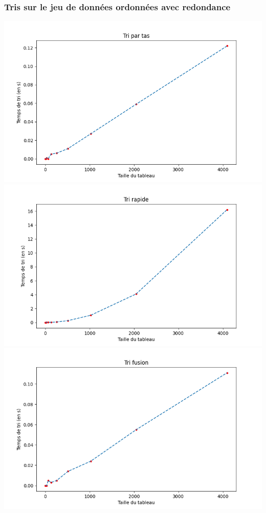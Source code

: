 \documentclass[11pt,a4paper]{article}
\begin{document}
\subsubsection{Tris sur le jeu de données ordonnées avec redondance}
    \includegraphics[scale = 0.7]{../Courbes/Valeurs_triées_avec_répétitions/Tri par tas.png}
    \includegraphics[scale = 0.7]{../Courbes/Valeurs_triées_avec_répétitions/Tri rapide.png}
    \includegraphics[scale = 0.7]{../Courbes/Valeurs_triées_avec_répétitions/Tri fusion.png}
\end{document}

